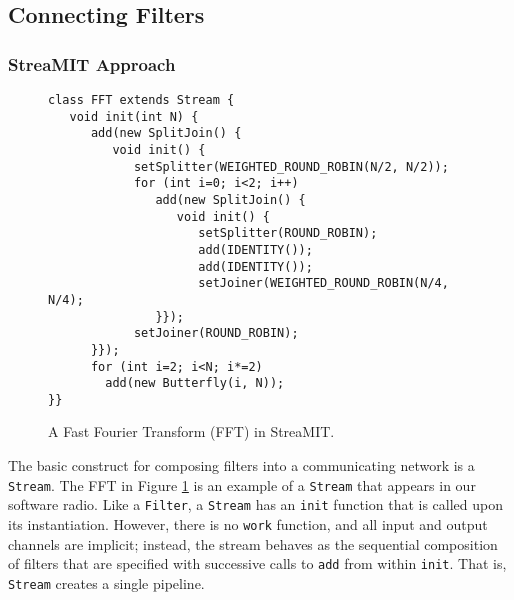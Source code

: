 \subsection{Connecting Filters}
\label{sec:connecting}

\subsubsection{StreaMIT Approach}

\begin{figure}
\scriptsize
\begin{verbatim}
class FFT extends Stream {
   void init(int N) {
      add(new SplitJoin() {
         void init() {
            setSplitter(WEIGHTED_ROUND_ROBIN(N/2, N/2));
            for (int i=0; i<2; i++) 
               add(new SplitJoin() {
                  void init() {
                     setSplitter(ROUND_ROBIN);
                     add(IDENTITY());
                     add(IDENTITY());
                     setJoiner(WEIGHTED_ROUND_ROBIN(N/4, N/4);
               }});
            setJoiner(ROUND_ROBIN);
      }});
      for (int i=2; i<N; i*=2)
        add(new Butterfly(i, N));
}}
\end{verbatim}
\vspace{-12pt}
\caption{\protect\small A Fast Fourier Transform (FFT) in StreaMIT.
\protect\label{fig:fft}}
\vspace{-12pt}
\end{figure}

The basic construct for composing filters into a communicating network
is a {\tt Stream}.  The FFT in Figure \ref{fig:fft} is an example of a
{\tt Stream} that appears in our software radio.  Like a {\tt Filter},
a {\tt Stream} has an {\tt init} function that is called upon its
instantiation.  However, there is no {\tt work} function, and all
input and output channels are implicit; instead, the stream behaves as
the sequential composition of filters that are specified with
successive calls to {\tt add} from within {\tt init}.  That is, {\tt
Stream} creates a single pipeline.

